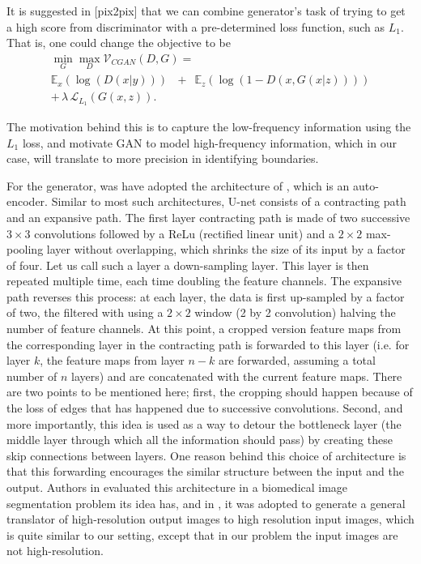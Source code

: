 It is suggested in [pix2pix] that we can combine generator's task of trying to get a high score from discriminator with a pre-determined loss function, such as $L_1$. That is, one could change the objective to be
\begin{equation}
\begin{array}{l}
\min_G \max_D \mathcal{V}_{CGAN}(D,G) =\\
\mathbb{E}_{x}(\log(D(x|y))) \, \, \, \,+ \, \, \, \mathbb{E}_{z}(\log(1-D(x,G(x|z))))\\
+\,\lambda \, \mathcal{L}_{L_1}(G(x,z)).
\end{array}
\end{equation}

The motivation behind this is to capture the low-frequency information using the $L_1$ loss, and motivate GAN to model high-frequency information, which in our case, will translate to more precision in identifying boundaries.

For the generator, was have adopted the architecture of \cite{unet}, which is an auto-encoder. Similar to most such architectures, U-net consists of a contracting path and an expansive path. The first layer contracting path is made of two successive $3 \times 3$ convolutions followed by a ReLu (rectified linear unit) and a $2 \times 2$ max-pooling layer without overlapping, which shrinks the size of its input by a factor of four. Let us call such a layer a down-sampling layer. This layer is then repeated multiple time, each time doubling the feature channels. The expansive path reverses this process: at each layer, the data is first up-sampled by a factor of two, the filtered with using a $2 \times 2$ window (2 by 2 convolution) halving the number of feature channels. At this point, a cropped version feature maps from the corresponding layer in the contracting path is forwarded to this layer (i.e. for layer $k$, the feature maps from layer $n-k$ are forwarded, assuming a total number of $n$ layers) and are concatenated with the current feature maps. There are two points to be mentioned here; first, the cropping should happen because of the loss of edges that has happened due to successive convolutions. Second, and more importantly, this idea is used as a way to detour the bottleneck layer (the middle layer through which all the information should pass) by creating these skip connections between layers. One reason behind this choice of architecture is that this forwarding encourages the similar structure between the input and the output. Authors in \cite{unet} evaluated this architecture in a biomedical image segmentation problem its idea has, and in \cite{pix2pix}, it was adopted to generate a general translator of high-resolution output images to high resolution input images, which is quite similar to our setting, except that in our problem the input images are not high-resolution.

